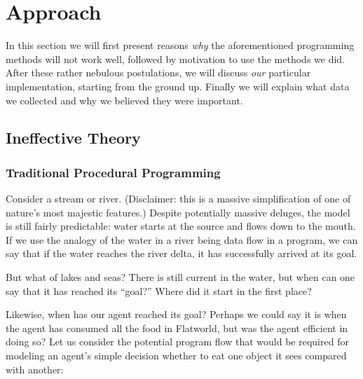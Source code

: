 \section{Approach} \label{sec:Approach}

In this section we will first present reasons \emph{why} the aforementioned
programming methods will not work well, followed by motivation to use the
methods we did. After these rather nebulous postulations, we will discuss
\emph{our} particular implementation, starting from the ground up. Finally
we will explain what data we collected and why we believed they were important.

\subsection{Ineffective Theory}

\subsubsection{Traditional Procedural Programming}
Consider a stream or river. (Disclaimer: this is a massive simplification of
one of nature's most majestic features.) Despite potentially massive deluges, 
the model is still fairly predictable: water starts at the source and flows 
down to the mouth. If we use the analogy of the water in a river being data 
flow in a program, we can say that if the water reaches the river delta, it
has successfully arrived at its goal.

But what of lakes and seas? There is still current in the water, but when
can one say that it has reached its ``goal?'' Where did it start in the first
place?

Likewise, when has our agent reached its goal? Perhaps we could say it is 
when the agent has consumed all the food in Flatworld, but was the agent 
efficient in doing so? Let us consider the potential program flow that
would be required for modeling an agent's simple decision whether to eat one
object it sees compared with another:

